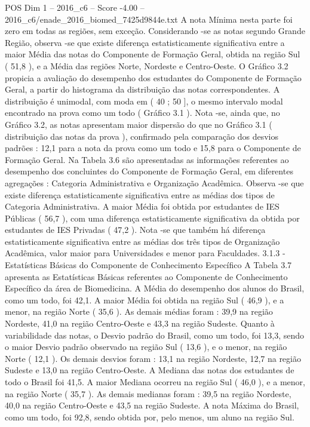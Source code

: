 \begin{textsample}{POS Dim 1 – 2016\_c6 – Score -4.00 – 2016\_c6/enade\_2016\_biomed\_7425d9844e.txt}
A nota Mínima nesta parte foi zero em todas as regiões, sem exceção.
Considerando -se as notas segundo Grande Região, observa -se que existe diferença estatisticamente significativa entre a maior Média das notas do Componente de Formação Geral, obtida na região Sul ( 51,8 ), e a Média das regiões Norte, Nordeste e Centro-Oeste.
O Gráfico 3.2 propicia a avaliação do desempenho dos estudantes do Componente de Formação Geral, a partir do histograma da distribuição das notas correspondentes.
A distribuição é unimodal, com moda em ( 40 ; 50 ], o mesmo intervalo modal encontrado na prova como um todo ( Gráfico 3.1 ).
Nota -se, ainda que, no Gráfico 3.2, as notas apresentam maior dispersão do que no Gráfico 3.1 ( distribuição das notas da prova ), confirmado pela comparação dos desvios padrões : 12,1 para a nota da prova como um todo e 15,8 para o Componente de Formação Geral.
Na Tabela 3.6 são apresentadas as informações referentes ao desempenho dos concluintes do Componente de Formação Geral, em diferentes agregações : Categoria Administrativa e Organização Acadêmica.
Observa -se que existe diferença estatisticamente significativa entre as médias dos tipos de Categoria Administrativa.
A maior Média foi obtida por estudantes de IES Públicas ( 56,7 ), com uma diferença estatisticamente significativa da obtida por estudantes de IES Privadas ( 47,2 ).
Nota -se que também há diferença estatisticamente significativa entre as médias dos três tipos de Organização Acadêmica, valor maior para Universidades e menor para Faculdades. 3.1.3 - Estatísticas Básicas do Componente de Conhecimento Específico A Tabela 3.7 apresenta as Estatísticas Básicas referentes ao Componente de Conhecimento Específico da área de Biomedicina.
A Média do desempenho dos alunos do Brasil, como um todo, foi 42,1.
A maior Média foi obtida na região Sul ( 46,9 ), e a menor, na região Norte ( 35,6 ).
As demais médias foram : 39,9 na região Nordeste, 41,0 na região Centro-Oeste e 43,3 na região Sudeste.
Quanto à variabilidade das notas, o Desvio padrão do Brasil, como um todo, foi 13,3, sendo o maior Desvio padrão observado na região Sul ( 13,6 ), e o menor, na região Norte ( 12,1 ).
Os demais desvios foram : 13,1 na região Nordeste, 12,7 na região Sudeste e 13,0 na região Centro-Oeste.
A Mediana das notas dos estudantes de todo o Brasil foi 41,5.
A maior Mediana ocorreu na região Sul ( 46,0 ), e a menor, na região Norte ( 35,7 ).
As demais medianas foram : 39,5 na região Nordeste, 40,0 na região Centro-Oeste e 43,5 na região Sudeste.
A nota Máxima do Brasil, como um todo, foi 92,8, sendo obtida por, pelo menos, um aluno na região Sul.

\end{textsample}
